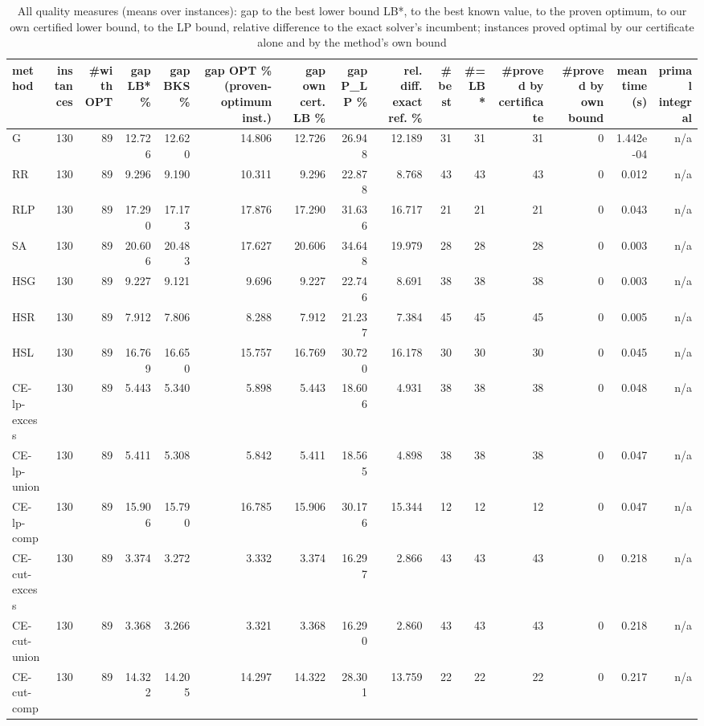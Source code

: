 \begin{table}[htbp]
\centering
\small
\caption{All quality measures (means over instances): gap to the best lower bound LB*, to the best known value, to the proven optimum, to our own certified lower bound, to the LP bound, relative difference to the exact solver's incumbent; instances proved optimal by our certificate alone and by the method's own bound}
\label{tab:E2_head_to_head_all_metrics}
\begin{tabular}{lrrrrrrrrrrrrrr}
\toprule
method & instances & \#with OPT & gap LB* \% & gap BKS \% & gap OPT \% (proven-optimum inst.) & gap own cert. LB \% & gap P\_LP \% & rel. diff. exact ref. \% & \#best & \#= LB* & \#proved by certificate & \#proved by own bound & mean time (s) & primal integral \\
\midrule
G & 130 & 89 & 12.726 & 12.620 & 14.806 & 12.726 & 26.948 & 12.189 & 31 & 31 & 31 & 0 & 1.442e-04 & n/a \\
RR & 130 & 89 & 9.296 & 9.190 & 10.311 & 9.296 & 22.878 & 8.768 & 43 & 43 & 43 & 0 & 0.012 & n/a \\
RLP & 130 & 89 & 17.290 & 17.173 & 17.876 & 17.290 & 31.636 & 16.717 & 21 & 21 & 21 & 0 & 0.043 & n/a \\
SA & 130 & 89 & 20.606 & 20.483 & 17.627 & 20.606 & 34.648 & 19.979 & 28 & 28 & 28 & 0 & 0.003 & n/a \\
HSG & 130 & 89 & 9.227 & 9.121 & 9.696 & 9.227 & 22.746 & 8.691 & 38 & 38 & 38 & 0 & 0.003 & n/a \\
HSR & 130 & 89 & 7.912 & 7.806 & 8.288 & 7.912 & 21.237 & 7.384 & 45 & 45 & 45 & 0 & 0.005 & n/a \\
HSL & 130 & 89 & 16.769 & 16.650 & 15.757 & 16.769 & 30.720 & 16.178 & 30 & 30 & 30 & 0 & 0.045 & n/a \\
CE-lp-excess & 130 & 89 & 5.443 & 5.340 & 5.898 & 5.443 & 18.606 & 4.931 & 38 & 38 & 38 & 0 & 0.048 & n/a \\
CE-lp-union & 130 & 89 & 5.411 & 5.308 & 5.842 & 5.411 & 18.565 & 4.898 & 38 & 38 & 38 & 0 & 0.047 & n/a \\
CE-lp-comp & 130 & 89 & 15.906 & 15.790 & 16.785 & 15.906 & 30.176 & 15.344 & 12 & 12 & 12 & 0 & 0.047 & n/a \\
CE-cut-excess & 130 & 89 & 3.374 & 3.272 & 3.332 & 3.374 & 16.297 & 2.866 & 43 & 43 & 43 & 0 & 0.218 & n/a \\
CE-cut-union & 130 & 89 & 3.368 & 3.266 & 3.321 & 3.368 & 16.290 & 2.860 & 43 & 43 & 43 & 0 & 0.218 & n/a \\
CE-cut-comp & 130 & 89 & 14.322 & 14.205 & 14.297 & 14.322 & 28.301 & 13.759 & 22 & 22 & 22 & 0 & 0.217 & n/a \\

\end{tabular}
\end{table}
